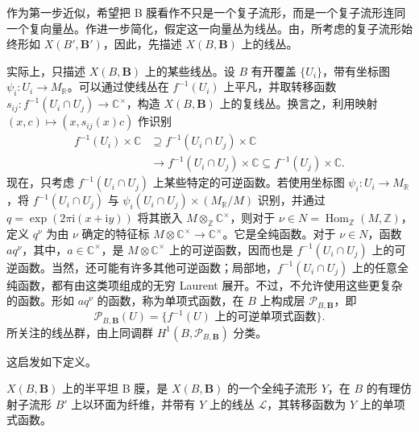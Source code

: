 作为第一步近似，希望把 B 膜看作不只是一个复子流形，而是一个复子流形连同一个复向量丛。作进一步简化，假定这一向量丛为线丛。由，所考虑的复子流形始终形如 $X(B',\mathbf B')$，因此，先描述 $X(B,\mathbf B)$ 上的线丛。

实际上，只描述 $X(B,\mathbf B)$ 上的某些线丛。设 $B$ 有开覆盖 $\{U_i\}$，带有坐标图 $\psi_i\colon U_i\to M_{\mathbb R}$。可以通过使线丛在 $f^{-1}(U_i)$ 上平凡，并取转移函数 $s_{ij}\colon f^{-1}(U_i\cap U_j)\to\mathbb C^\times$，构造 $X(B,\mathbf B)$ 上的复线丛。换言之，利用映射 $(x,c)\mapsto(x,s_{ij}(x)c)$ 作识别
\[
\begin{aligned}
f^{-1}(U_i)\times\mathbb C
&\supseteq f^{-1}(U_i\cap U_j)\times\mathbb C\\
&\longrightarrow f^{-1}(U_i\cap U_j)\times\mathbb C
\subseteq f^{-1}(U_j)\times\mathbb C.
\end{aligned}
\]
现在，只考虑 $f^{-1}(U_i\cap U_j)$ 上某些特定的可逆函数。若使用坐标图 $\psi_i\colon U_i\to M_{\mathbb R}$，将 $f^{-1}(U_i\cap U_j)$ 与 $\psi_i(U_i\cap U_j)\times(M_{\mathbb R}/M)$ 识别，并通过 $q=\exp(2\pi\mathrm i(x+\mathrm i y))$ 将其嵌入 $M\otimes_{\mathbb Z}\mathbb C^\times$，则对于 $\nu\in N=\operatorname{Hom}_{\mathbb Z}(M,\mathbb Z)$，定义 $q^\nu$ 为由 $\nu$ 确定的特征标 $M\otimes\mathbb C^\times\to\mathbb C^\times$。它是全纯函数。对于 $\nu\in N$，函数 $aq^\nu$，其中，$a\in\mathbb C^\times$，是 $M\otimes\mathbb C^\times$ 上的可逆函数，因而也是 $f^{-1}(U_i\cap U_j)$ 上的可逆函数。当然，还可能有许多其他可逆函数；局部地，$f^{-1}(U_i\cap U_j)$ 上的任意全纯函数，都有由这类项组成的无穷 Laurent 展开。不过，不允许使用这些更复杂的函数。形如 $aq^\nu$ 的函数，称为单项式函数，在 $B$ 上构成层 $\mathcal P_{B,\mathbf B}$，即
\[
\mathcal P_{B,\mathbf B}(U)
=\{f^{-1}(U)\text{ 上的可逆单项式函数}\}.
\]
所关注的线丛群，由上同调群 $H^1(B,\mathcal P_{B,\mathbf B})$ 分类。

这启发如下定义。

\begin{definition}\label{def:6.58}
$X(B,\mathbf B)$ 上的半平坦 B 膜，是 $X(B,\mathbf B)$ 的一个全纯子流形 $Y$，在 $B$ 的有理仿射子流形 $B'$ 上以环面为纤维，并带有 $Y$ 上的线丛 $\mathcal L$，其转移函数为 $Y$ 上的单项式函数。
\end{definition}

